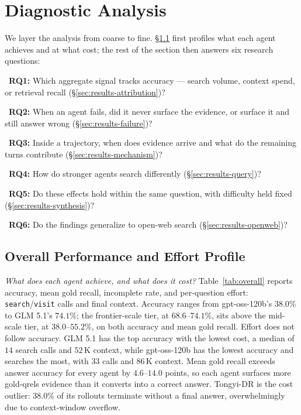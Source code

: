 \section{Diagnostic Analysis}
\label{sec:analysis}

We layer the analysis from coarse to fine. §\ref{sec:results-overview} first profiles what each agent achieves and at what cost; the rest of the section then answers six research questions:

\noindent\textbullet\ \textbf{RQ1:} Which aggregate signal tracks accuracy --- search volume, context spend, or retrieval recall (§\ref{sec:results-attribution})?

\noindent\textbullet\ \textbf{RQ2:} When an agent fails, did it never surface the evidence, or surface it and still answer wrong (§\ref{sec:results-failure})?

\noindent\textbullet\ \textbf{RQ3:} Inside a trajectory, when does evidence arrive and what do the remaining turns contribute (§\ref{sec:results-mechanism})?

\noindent\textbullet\ \textbf{RQ4:} How do stronger agents search differently (§\ref{sec:results-query})?

\noindent\textbullet\ \textbf{RQ5:} Do these effects hold within the same question, with difficulty held fixed (§\ref{sec:results-synthesis})?

\noindent\textbullet\ \textbf{RQ6:} Do the findings generalize to open-web search (§\ref{sec:results-openweb})?

\subsection{Overall Performance and Effort Profile}
\label{sec:results-overview}

\emph{What does each agent achieve, and what does it cost?} Table~\ref{tab:overall} reports accuracy, mean gold recall, incomplete rate, and per-question effort: \texttt{search}/\texttt{visit} calls and final context. Accuracy ranges from gpt-oss-120b's $38.0\%$ to GLM 5.1's $74.1\%$; the frontier-scale tier, at $68.6\text{--}74.1\%$, sits above the mid-scale tier, at $38.0\text{--}55.2\%$, on both accuracy and mean gold recall. Effort does not follow accuracy. GLM 5.1 has the top accuracy with the lowest cost, a median of $14$ search calls and $52\,$K context, while gpt-oss-120b has the lowest accuracy and searches the most, with $33$ calls and $86\,$K context. Mean gold recall exceeds answer accuracy for every agent by $4.6\text{--}14.0$ points, so each agent surfaces more gold-qrels evidence than it converts into a correct answer. Tongyi-DR is the cost outlier: $38.0\%$ of its rollouts terminate without a final answer, overwhelmingly due to context-window overflow.

